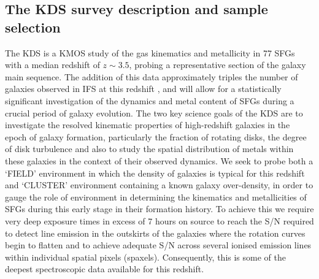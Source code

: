 \documentclass[fleqn,usenatbib]{mn2e}
\begin{document}
\subsection{The KDS survey description and sample selection}\label{subsec:survey_intro}
The KDS is a KMOS study of the gas kinematics and metallicity in 77 SFGs with a median redshift of $z\sim3.5$, probing a representative section of the galaxy main sequence.
The addition of this data approximately triples the number of galaxies observed in IFS at this redshift \citep{Cresci2010,Lemoine-Busserolle2010,Gnerucci2011}, and will allow for a statistically significant investigation of the dynamics and metal content of SFGs during a crucial period of galaxy evolution. 
The two key science goals of the KDS are to investigate the resolved kinematic properties of high-redshift galaxies in the epoch of galaxy formation, particularly the fraction of rotating disks, the degree of disk turbulence and also to study the spatial distribution of metals within these galaxies in the context of their observed dynamics.
We seek to probe both a `FIELD' environment in which the density of galaxies is typical for this redshift and `CLUSTER' environment containing a known galaxy over-density, in order to gauge the role of environment in determining the kinematics and metallicities of SFGs during this early stage in their formation history.
To achieve this we require very deep exposure times in excess of 7 hours on source to reach the S/N required to detect line emission in the outskirts of the galaxies where the rotation curves begin to flatten and to achieve adequate S/N across several ionised emission lines within individual spatial pixels (spaxels).
Consequently, this is some of the deepest spectroscopic data available for this redshift. 
\end{document}
